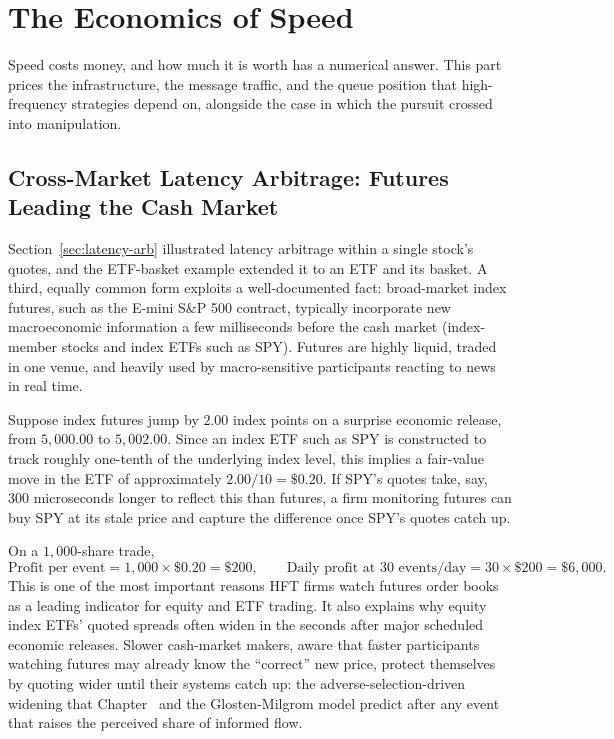 \documentclass[../ai_in_finance]{subfiles}
\begin{document}
\section{The Economics of Speed}

Speed costs money, and how much it is worth has a numerical answer. This part prices the infrastructure, the message traffic, and the queue position that high-frequency strategies depend on, alongside the case in which the pursuit crossed into manipulation.

\subsection{Cross-Market Latency Arbitrage: Futures Leading the Cash Market}

Section~\ref{sec:latency-arb} illustrated latency arbitrage within a single stock's quotes, and the ETF-basket example extended it to an ETF and its basket. A third, equally common form exploits a well-documented fact: broad-market index futures, such as the E-mini S\&P 500 contract, typically incorporate new macroeconomic information a few milliseconds before the cash market (index-member stocks and index ETFs such as SPY). Futures are highly liquid, traded in one venue, and heavily used by macro-sensitive participants reacting to news in real time.

Suppose index futures jump by $2.00$ index points on a surprise economic release, from $5{,}000.00$ to $5{,}002.00$. Since an index ETF such as SPY is constructed to track roughly one-tenth of the underlying index level, this implies a fair-value move in the ETF of approximately $2.00/10=\$0.20$. If SPY's quotes take, say, $300$ microseconds longer to reflect this than futures, a firm monitoring futures can buy SPY at its stale price and capture the difference once SPY's quotes catch up.

On a $1{,}000$-share trade,
\begin{equation*}
\text{Profit per event} = 1{,}000 \times \$0.20 = \$200, \qquad \text{Daily profit at } 30 \text{ events/day} = 30 \times \$200 = \$6{,}000.
\end{equation*}
This is one of the most important reasons HFT firms watch futures order books as a leading indicator for equity and ETF trading. It also explains why equity index ETFs' quoted spreads often widen in the seconds after major scheduled economic releases. Slower cash-market makers, aware that faster participants watching futures may already know the ``correct'' new price, protect themselves by quoting wider until their systems catch up: the adverse-selection-driven widening that Chapter~ and the Glosten-Milgrom model predict after any event that raises the perceived share of informed flow.
\end{document}
